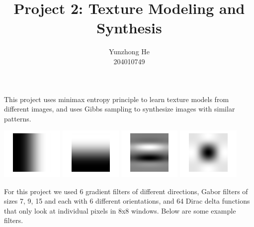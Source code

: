 \documentclass[12pt]{article}
\newenvironment{problem}[2][Part]{\begin{trivlist}
\item[\hskip \labelsep {\bfseries #1}\hskip \labelsep {\bfseries #2}]}{\end{trivlist}}
\begin{document}
 
 
\title{Project 2: Texture Modeling and Synthesis}%
\author{Yunzhong He\\ %
204010749} %
 
\maketitle

\begin{problem}{I Objective}
\item{}
This project uses minimax entropy principle to learn texture models from different images, and uses Gibbs sampling to synthesize images with similar patterns.
\begin{center}
	\includegraphics[width=3cm]{Code/filter_1.png}
	\includegraphics[width=3cm]{Code/filter_2.png}
	\includegraphics[width=3cm]{Code/filter_3.png}
	\includegraphics[width=3cm]{Code/filter_4.png}
\end{center}
\end{problem}

\begin{problem}{II Filters}
\item{}
For this project we used 6 gradient filters of different directions, Gabor filters of sizes 7, 9, 15 and each with 6 different orientations, and 64 Dirac delta functions that only look at individual pixels in 8x8 windows. Below are some example filters.
\end{problem}
\end{document}
